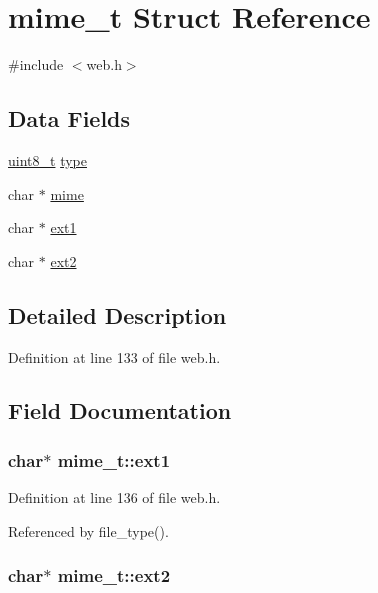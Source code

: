 \hypertarget{structmime__t}{\section{mime\-\_\-t Struct Reference}
\label{structmime__t}
}


{\ttfamily \#include $<$web.\-h$>$}

\subsection*{Data Fields}
\begin{DoxyCompactItemize}
\item 
\hyperlink{send_8c_aba7bc1797add20fe3efdf37ced1182c5}{uint8\-\_\-t} \hyperlink{structmime__t_ae69826dcfd475d65fa0fe8a1574bb3af}{type}
\item 
char $\ast$ \hyperlink{structmime__t_ad796d16eaee60d7435bff66b2e9b8a8d}{mime}
\item 
char $\ast$ \hyperlink{structmime__t_a22af12abb536a48d3425a3a4d1cce2a4}{ext1}
\item 
char $\ast$ \hyperlink{structmime__t_ae16e9342ecd4df97a2564658f1f506b1}{ext2}
\end{DoxyCompactItemize}


\subsection{Detailed Description}


Definition at line 133 of file web.\-h.



\subsection{Field Documentation}
\hypertarget{structmime__t_a22af12abb536a48d3425a3a4d1cce2a4}{
\subsubsection[{ext1}]{\setlength{\rightskip}{0pt plus 5cm}char$\ast$ mime\-\_\-t\-::ext1}}\label{structmime__t_a22af12abb536a48d3425a3a4d1cce2a4}


Definition at line 136 of file web.\-h.



Referenced by file\-\_\-type().

\hypertarget{structmime__t_ae16e9342ecd4df97a2564658f1f506b1}{
\subsubsection[{ext2}]{\setlength{\rightskip}{0pt plus 5cm}char$\ast$ mime\-\_\-t\-::ext2}}\label{structmime__t_ae16e9342ecd4df97a2564658f1f506b1}


